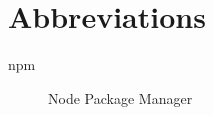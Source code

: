 \chapter*{Abbreviations}\label{abbr}
\begin{description}
\item[npm] Node Package Manager
\end{description}

